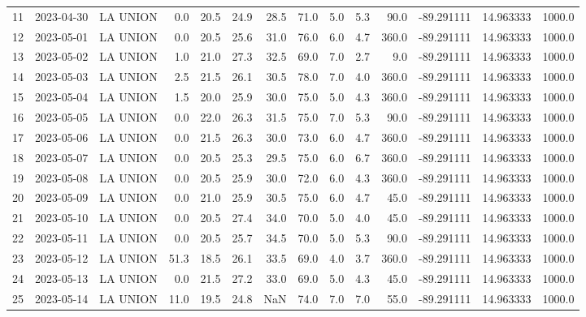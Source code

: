 \documentclass[12pt]{article}
\begin{document}
\begin{center}
\begin{tabular}{lllrrrrrrrrrrr}
11  & 2023-04-30 &  LA UNION &     0.0 &  20.5 &   24.9 &  28.5 &     71.0 &  5.0 &         5.3 &        90.0 & -89.291111 &  14.963333 &   1000.0 \\
12  & 2023-05-01 &  LA UNION &     0.0 &  20.5 &   25.6 &  31.0 &     76.0 &  6.0 &         4.7 &       360.0 & -89.291111 &  14.963333 &   1000.0 \\
13  & 2023-05-02 &  LA UNION &     1.0 &  21.0 &   27.3 &  32.5 &     69.0 &  7.0 &         2.7 &         9.0 & -89.291111 &  14.963333 &   1000.0 \\
14  & 2023-05-03 &  LA UNION &     2.5 &  21.5 &   26.1 &  30.5 &     78.0 &  7.0 &         4.0 &       360.0 & -89.291111 &  14.963333 &   1000.0 \\
15  & 2023-05-04 &  LA UNION &     1.5 &  20.0 &   25.9 &  30.0 &     75.0 &  5.0 &         4.3 &       360.0 & -89.291111 &  14.963333 &   1000.0 \\
16  & 2023-05-05 &  LA UNION &     0.0 &  22.0 &   26.3 &  31.5 &     75.0 &  7.0 &         5.3 &        90.0 & -89.291111 &  14.963333 &   1000.0 \\
17  & 2023-05-06 &  LA UNION &     0.0 &  21.5 &   26.3 &  30.0 &     73.0 &  6.0 &         4.7 &       360.0 & -89.291111 &  14.963333 &   1000.0 \\
18  & 2023-05-07 &  LA UNION &     0.0 &  20.5 &   25.3 &  29.5 &     75.0 &  6.0 &         6.7 &       360.0 & -89.291111 &  14.963333 &   1000.0 \\
19  & 2023-05-08 &  LA UNION &     0.0 &  20.5 &   25.9 &  30.0 &     72.0 &  6.0 &         4.3 &       360.0 & -89.291111 &  14.963333 &   1000.0 \\
20  & 2023-05-09 &  LA UNION &     0.0 &  21.0 &   25.9 &  30.5 &     75.0 &  6.0 &         4.7 &        45.0 & -89.291111 &  14.963333 &   1000.0 \\
21  & 2023-05-10 &  LA UNION &     0.0 &  20.5 &   27.4 &  34.0 &     70.0 &  5.0 &         4.0 &        45.0 & -89.291111 &  14.963333 &   1000.0 \\
22  & 2023-05-11 &  LA UNION &     0.0 &  20.5 &   25.7 &  34.5 &     70.0 &  5.0 &         5.3 &        90.0 & -89.291111 &  14.963333 &   1000.0 \\
23  & 2023-05-12 &  LA UNION &    51.3 &  18.5 &   26.1 &  33.5 &     69.0 &  4.0 &         3.7 &       360.0 & -89.291111 &  14.963333 &   1000.0 \\
24  & 2023-05-13 &  LA UNION &     0.0 &  21.5 &   27.2 &  33.0 &     69.0 &  5.0 &         4.3 &        45.0 & -89.291111 &  14.963333 &   1000.0 \\
25  & 2023-05-14 &  LA UNION &    11.0 &  19.5 &   24.8 &   NaN &     74.0 &  7.0 &         7.0 &        55.0 & -89.291111 &  14.963333 &   1000.0 \\
\bottomrule
\end{tabular}

        
        \end{center}
        
\end{document}
